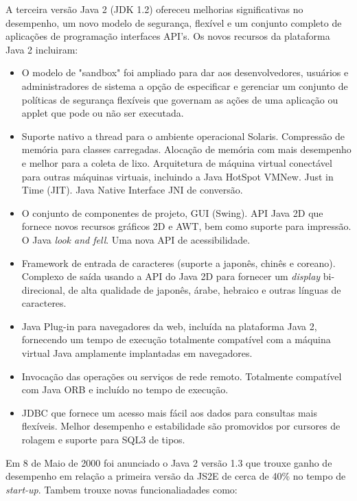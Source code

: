 A terceira versão Java 2 (\acs{JDK} 1.2) ofereceu melhorias significativas no desempenho, um novo modelo de segurança, flexível e um conjunto completo de aplicações de programação interfaces \acs{API}'s. Os novos recursos da plataforma Java 2 incluiram: 
\begin{itemize}
  \item O modelo de "sandbox"  foi ampliado para dar aos desenvolvedores, usuários e administradores de sistema a opção de especificar e gerenciar um conjunto de políticas de segurança flexíveis que governam as ações de uma aplicação ou applet que pode ou não ser executada.
  \item Suporte nativo a thread para o ambiente operacional Solaris. Compressão de memória para classes carregadas. Alocação de memória com mais desempenho e melhor para a coleta de lixo. Arquitetura de máquina virtual conectável para outras máquinas virtuais, incluindo a Java HotSpot VMNew. Just in Time (JIT). Java Native Interface \acs{JNI} de conversão.
  \item O conjunto de componentes de projeto, \acs{GUI} (Swing). \acs{API} Java 2D que fornece novos recursos gráficos 2D e \acs{AWT}, bem como suporte para impressão. O Java {\it look and fell}. Uma nova API de acessibilidade.
  \item Framework de entrada de caracteres (suporte a japonês, chinês e coreano). Complexo de saída usando a \acs{API} do Java 2D para fornecer um {\it display} bi-direcional, de alta qualidade de japonês, árabe, hebraico e outras línguas de caracteres.
  \item Java Plug-in para navegadores da web, incluída na plataforma Java 2, fornecendo um tempo de execução totalmente compatível com a máquina virtual Java amplamente implantadas em navegadores.
  \item Invocação das operações ou serviços de rede remoto. Totalmente compatível com Java ORB e incluído no tempo de execução.
  \item \acs{JDBC} que fornece um acesso mais fácil aos dados para consultas mais flexíveis. Melhor desempenho e estabilidade são promovidos por cursores de rolagem e suporte para SQL3 de tipos.
\end{itemize}

Em 8 de Maio de 2000 foi anunciado o Java 2 versão 1.3 que trouxe ganho de desempenho em relação a primeira versão da JS2E de cerca de 40\%  no tempo de {\it  start-up}. Tambem trouxe novas funcionaliadades como: 

